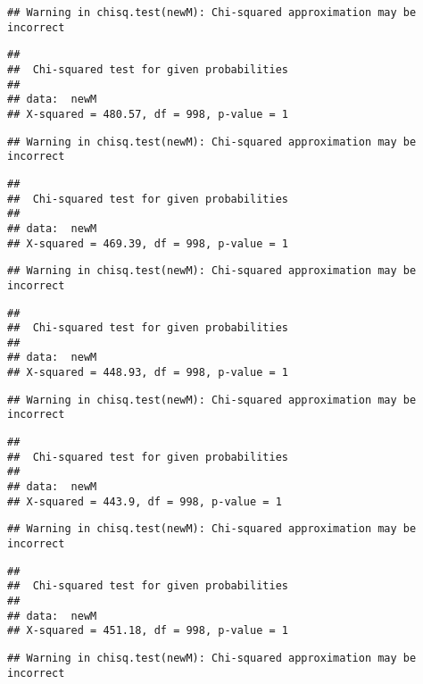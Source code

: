 \documentclass[]{article}
\begin{document}
\begin{verbatim}
## Warning in chisq.test(newM): Chi-squared approximation may be incorrect
\end{verbatim}

\begin{verbatim}
## 
##  Chi-squared test for given probabilities
## 
## data:  newM
## X-squared = 480.57, df = 998, p-value = 1
\end{verbatim}

\begin{verbatim}
## Warning in chisq.test(newM): Chi-squared approximation may be incorrect
\end{verbatim}

\begin{verbatim}
## 
##  Chi-squared test for given probabilities
## 
## data:  newM
## X-squared = 469.39, df = 998, p-value = 1
\end{verbatim}

\begin{verbatim}
## Warning in chisq.test(newM): Chi-squared approximation may be incorrect
\end{verbatim}

\begin{verbatim}
## 
##  Chi-squared test for given probabilities
## 
## data:  newM
## X-squared = 448.93, df = 998, p-value = 1
\end{verbatim}

\begin{verbatim}
## Warning in chisq.test(newM): Chi-squared approximation may be incorrect
\end{verbatim}

\begin{verbatim}
## 
##  Chi-squared test for given probabilities
## 
## data:  newM
## X-squared = 443.9, df = 998, p-value = 1
\end{verbatim}

\begin{verbatim}
## Warning in chisq.test(newM): Chi-squared approximation may be incorrect
\end{verbatim}

\begin{verbatim}
## 
##  Chi-squared test for given probabilities
## 
## data:  newM
## X-squared = 451.18, df = 998, p-value = 1
\end{verbatim}

\begin{verbatim}
## Warning in chisq.test(newM): Chi-squared approximation may be incorrect
\end{verbatim}
\end{document}
